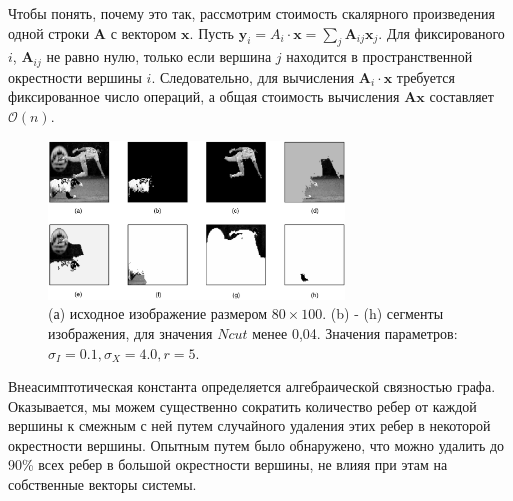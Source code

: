 \documentclass[a4paper,10pt]{article}
\theoremstyle{plain}
\theoremstyle{definition}
\theoremstyle{remark}
\begin{document}
\begin{enumerate}
Чтобы понять, почему это так, рассмотрим стоимость скалярного произведения одной строки $\mathbf { A }$ с вектором $\mathbf { x }$. Пусть $\mathbf { y } _ { i } = A _ { i } \cdot \mathbf { x } = \sum _ { j } \boldsymbol { A } _ { i j } \mathbf { x } _ { j }$. Для фиксированого $i$, $\boldsymbol { A } _ { i j }$ не равно нулю, только если вершина $j$ находится в пространственной окрестности вершины $i$. Следовательно, для вычисления $\boldsymbol {A} _ { i } \cdot \mathbf { x }$ требуется фиксированное число операций, а общая стоимость вычисления $\boldsymbol{A} \mathbf { x }$ составляет $\mathcal{O}(n)$.

\begin{figure}
\centering
\includegraphics[width=0.7\textwidth]{fig_4.png}
\captionsetup{justification=centering}
\caption{\label{fig:segments}(а) исходное изображение размером $80 \times 100$. (b) - (h) сегменты изображения,
для значения $Ncut$ менее 0,04. Значения параметров: $\sigma _ { I } = 0.1 , \sigma _ { X } = 4.0 , r = 5$.}
\end{figure}

Внеасимптотическая константа определяется алгебраической связностью графа. Оказывается, мы можем существенно сократить количество ребер от каждой вершины к смежным с ней путем случайного удаления этих ребер в некоторой окрестности вершины. Опытным путем было обнаружено, что можно удалить до 90\% всех ребер в большой окрестности вершины, не влияя при этам на собственные векторы системы.


\end{enumerate}
\end{document}
